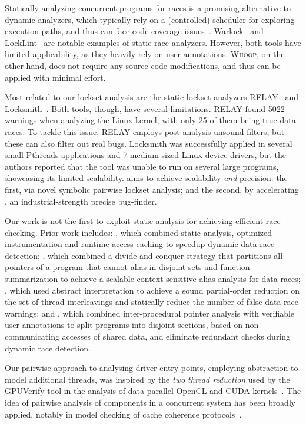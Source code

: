 Statically analyzing concurrent programs for races is a promising alternative to dynamic analyzers, which typically rely on a (controlled) scheduler for exploring execution paths, and thus can face code coverage issues~\cite{musuvathi2008finding}. Warlock~\cite{sterling1993warlock} and LockLint~\cite{oracle2010locklint} are notable examples of static race analyzers. However, both tools have limited applicability, as they heavily rely on user annotations. \textsc{Whoop}, on the other hand, does not require any source code modifications, and thus can be applied with minimal effort.

Most related to our lockset analysis are the static lockset analyzers RELAY~\cite{voung2007relay} and Locksmith~\cite{pratikakis2006locksmith}. Both tools, though, have several limitations. RELAY found 5022 warnings when analyzing the Linux kernel, with only 25 of them being true data races. To tackle this issue, RELAY employs post-analysis unsound filters, but these can also filter out real bugs. Locksmith was successfully applied in several small Pthreads applications and 7 medium-sized Linux device drivers, but the authors reported that the tool was unable to run on several large programs, showcasing its limited scalability. \whoop aims to achieve scalability \emph{and} precision: the first, via novel symbolic pairwise lockset analysis; and the second, by accelerating \corral, an industrial-strength precise bug-finder.

Our work is not the first to exploit static analysis for achieving efficient race-checking. Prior work includes: \cite{choi2002efficient}, which combined static analysis, optimized instrumentation and runtime access caching to speedup dynamic data race detection; \cite{kahlon2007fast}, which combined a divide-and-conquer strategy that partitions all pointers of a program that cannot alias in disjoint sets and function summarization to achieve a scalable context-sensitive alias analysis for data races; \cite{kahlon2009semantic}, which used abstract interpretation to achieve a sound partial-order reduction on the set of thread interleavings and statically reduce the number of false data race warnings; and \cite{das2015section}, which combined inter-procedural pointer analysis with verifiable user annotations to split programs into disjoint sections, based on non-communicating accesses of shared data, and eliminate redundant checks during dynamic race detection.

Our pairwise approach to analysing driver entry points, employing abstraction to model additional threads, was inspired by the \emph{two thread reduction} used by the GPUVerify tool in the analysis of data-parallel OpenCL and CUDA kernels~\cite{gpuverify,bardsley2014engineering}.  The idea of pairwise analysis of components in a concurrent system has been broadly applied, notably in model checking of cache coherence protocols~\cite{mcmillan1999verification}.
